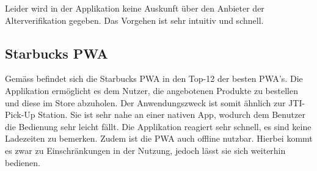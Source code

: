Leider wird in der Applikation keine Auskunft über den Anbieter der Alterverifikation gegeben. Das Vorgehen ist sehr intuitiv und schnell. 

\subsection{Starbucks \gls{PWA}}
Gemäss \cite{bestPWA} befindet sich die Starbucks \gls{PWA} in den Top-12 der besten \gls{PWA}'s. Die Applikation ermöglicht es dem Nutzer, die angebotenen Produkte zu bestellen und diese im Store abzuholen. Der Anwendungszweck ist somit ähnlich zur JTI-Pick-Up Station. Sie ist sehr nahe an einer nativen App, wodurch dem Benutzer die Bedienung sehr leicht fällt. Die Applikation reagiert sehr schnell, es sind keine Ladezeiten zu bemerken. Zudem ist die \gls{PWA} auch offline nutzbar. Hierbei kommt es zwar zu Einschränkungen in der Nutzung, jedoch lässt sie sich weiterhin bedienen. 
